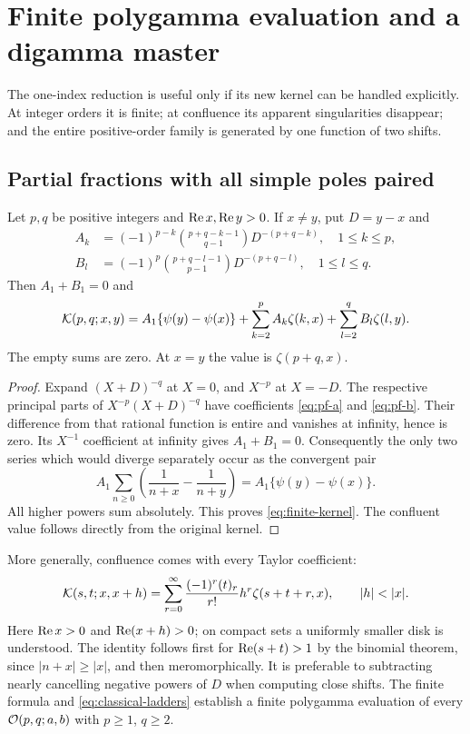 \section{Finite polygamma evaluation and a digamma master}
\label{sec:integer}

The one-index reduction is useful only if its new kernel can be handled
explicitly. At integer orders it is finite; at confluence its apparent
singularities disappear; and the entire positive-order family is
generated by one function of two shifts.

\subsection{Partial fractions with all simple poles paired}

\begin{proposition}\label{prop:partial-fractions}
Let $p,q$ be positive integers and $\operatorname{Re} x,\operatorname{Re} y>0$. If $x\ne y$, put
$D=y-x$ and
\begin{align}
 A_k&=(-1)^{p-k}\binom{p+q-k-1}{q-1}D^{-(p+q-k)},\quad 1\le k\le p,
 \label{eq:pf-a}\\
 B_l&=(-1)^p\binom{p+q-l-1}{p-1}D^{-(p+q-l)},\quad 1\le l\le q.
 \label{eq:pf-b}
\end{align}
Then $A_1+B_1=0$ and
\begin{equation}\label{eq:finite-kernel}
 \mathcal K(p,q;x,y)=A_1\{\psi(y)-\psi(x)\}
 +\sum_{k=2}^{p}A_k\zeta(k,x)
 +\sum_{l=2}^{q}B_l\zeta(l,y).
\end{equation}
The empty sums are zero. At $x=y$ the value is $\zeta(p+q,x)$.
\end{proposition}

\begin{proof}
Expand $(X+D)^{-q}$ at $X=0$, and $X^{-p}$ at $X=-D$.
The respective principal parts of $X^{-p}(X+D)^{-q}$ have coefficients
\eqref{eq:pf-a} and \eqref{eq:pf-b}. Their difference from that rational
function is entire and vanishes at infinity, hence is zero.
Its $X^{-1}$ coefficient at infinity gives $A_1+B_1=0$.
Consequently the only two series which would diverge separately occur
as the convergent pair
\[
 A_1\sum_{n\ge0}\left(\frac1{n+x}-\frac1{n+y}\right)
 =A_1\{\psi(y)-\psi(x)\}.
\]
All higher powers sum absolutely. This proves \eqref{eq:finite-kernel}.
The confluent value follows directly from the original kernel.
\end{proof}

More generally, confluence comes with every Taylor coefficient:
\begin{equation}\label{eq:kernel-confluence}
 \Kern(s,t;x,x+h)=\sum_{r=0}^{\infty}
 \frac{(-1)^r(t)_r}{r!}h^r\zeta(s+t+r,x),\qquad |h|<|x|.
\end{equation}
Here $\operatorname{Re} x>0$ and $\operatorname{Re}(x+h)>0$; on compact sets a uniformly
smaller disk is understood.
The identity follows first for $\operatorname{Re}(s+t)>1$ by the binomial theorem,
since $|n+x|\ge |x|$, and then meromorphically. It is preferable to
subtracting nearly cancelling negative powers of $D$ when computing
close shifts. The finite formula and \eqref{eq:classical-ladders}
establish a finite polygamma evaluation of every
$\mathcal O(p,q;a,b)$ with $p\ge1$, $q\ge2$.

